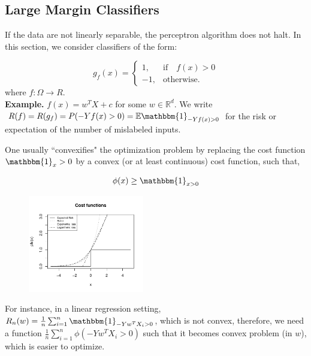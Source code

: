 \documentclass[11pt, english]{article}
\begin{document}
\subsection{Large Margin Classifiers}%
 
If the data are not linearly separable, the perceptron algorithm does not halt. In this section, we consider classifiers of the form:
 
\begin{equation}
	g_f(x)=\begin{cases}
	1, & \text{if} \quad f(x) > 0\\
	-1, & \text{otherwise}.
	\end{cases}
\end{equation}
where $f:\Omega \rightarrow R$.\\
\textbf{Example.} $f(x) = w^TX+c$ for some $w \in \mathbb{R}^d$.
We write $R(f) = R(g_f) = P(-Yf(x)>0) = \mathbb{E}\mathbbm{1}_{-Yf(x)>0}$ for the risk or expectation of the number of mislabeled inputs. %
 
One usually ``convexifies" the optimization problem by replacing the cost function $\mathbbm{1}_x>0$ by a convex (or at least continuous) cost function, such that, %
 
\begin{equation}
\phi(x) \geq \mathbbm{1}_{x>0} %
\end{equation}
 
 
\begin{figure}
 	\centering
 	\includegraphics[width=0.45\textwidth]{cost_functions.pdf}
\end{figure}
 
For instance, in a linear regression setting, $R_n(w) = \frac{1}{n} \sum_{i=1}^{n} \mathbbm{1}_{-Yw^TX_i>0}$, which is not convex, therefore, we need a function $\frac{1}{n} \sum_{i=1}^{n} \phi(-Yw^TX_i>0)$ such that it becomes convex problem (in $w$), which is easier to optimize.\\ %
 
\end{document}
